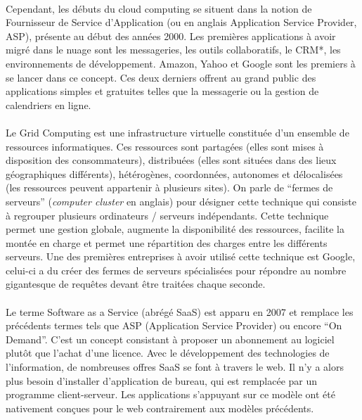\documentclass[a4paper,12pt]{report}
\begin{document}
\begin{onehalfspace}
	\paragraph*{}
	Cependant, les débuts du cloud computing se situent dans la notion de Fournisseur de Service d’Application (ou en anglais Application Service Provider, ASP), présente au début des années 2000. Les premières applications à avoir migré dans le nuage sont les messageries, les outils collaboratifs, le CRM*, les environnements de développement. Amazon, Yahoo et Google sont les premiers à se lancer dans ce concept. Ces deux derniers offrent au grand public des applications simples et gratuites telles que la messagerie ou la gestion de calendriers en ligne.
	
	\paragraph*{}
	Le Grid Computing est une infrastructure virtuelle constituée d’un ensemble de ressources informatiques. Ces ressources sont partagées (elles sont mises à disposition des consommateurs), distribuées (elles sont situées dans des lieux géographiques différents), hétérogènes, coordonnées, autonomes et délocalisées (les ressources peuvent appartenir à plusieurs sites). On parle de “fermes de serveurs” (\textit{computer cluster} en anglais) pour désigner cette technique qui consiste à regrouper plusieurs ordinateurs / serveurs indépendants. Cette technique permet une gestion globale, augmente la disponibilité des ressources, facilite la montée en charge et permet une répartition des charges entre les différents serveurs.
	Une des premières entreprises à avoir utilisé cette technique est Google, celui-ci a du créer des fermes de serveurs spécialisées pour répondre au nombre gigantesque de requêtes devant être traitées chaque seconde.
	
	\paragraph*{}
	Le terme Software as a Service (abrégé SaaS) est apparu en 2007 et remplace les précédents termes tels que ASP (Application Service Provider) ou encore “On Demand”.
	C’est un concept consistant à proposer un abonnement au logiciel plutôt que l’achat d’une licence. Avec le développement des technologies de l’information, de nombreuses offres SaaS se font à travers le web. Il n’y a alors plus besoin d’installer d’application de bureau, qui est remplacée par un programme client-serveur.
	Les applications s’appuyant sur ce modèle ont été nativement conçues pour le web contrairement aux modèles précédents.
	

\end{onehalfspace}
\end{document}
